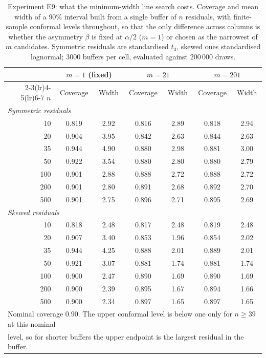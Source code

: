 \begin{table}[ht]
\centering
\small
\setlength{\tabcolsep}{5pt}
\caption{Experiment E9: what the minimum-width line search costs.
         Coverage and mean width of a $90\%$ interval built from a
         single buffer of $n$ residuals, with finite-sample conformal
         levels throughout, so that the only difference across
         columns is whether the asymmetry $\beta$ is fixed at
         $\alpha/2$ ($m = 1$) or chosen as the narrowest of $m$
         candidates.  Symmetric residuals are standardised $t_3$,
         skewed ones standardised lognormal; $3000$ buffers per cell,
         evaluated against $200\,000$ draws.}
\label{tab:e9_linesearch}
\begin{tabular}{r cc cc cc}
\toprule
 & \multicolumn{2}{c}{$m = 1$ (fixed)} & \multicolumn{2}{c}{$m = 21$} & \multicolumn{2}{c}{$m = 201$} \\
\cmidrule(lr){2-3}\cmidrule(lr){4-5}\cmidrule(lr){6-7}
$n$ & Coverage & Width & Coverage & Width & Coverage & Width \\
\midrule
\multicolumn{7}{l}{\emph{Symmetric residuals}} \\
10 & 0.819 & 2.92 & 0.816 & 2.89 & 0.818 & 2.94 \\
20 & 0.904 & 3.95 & 0.842 & 2.63 & 0.844 & 2.63 \\
35 & 0.944 & 4.90 & 0.880 & 2.98 & 0.881 & 3.00 \\
50 & 0.922 & 3.54 & 0.880 & 2.80 & 0.880 & 2.79 \\
100 & 0.901 & 2.88 & 0.888 & 2.72 & 0.888 & 2.72 \\
200 & 0.901 & 2.80 & 0.891 & 2.68 & 0.892 & 2.70 \\
500 & 0.901 & 2.75 & 0.896 & 2.71 & 0.895 & 2.69 \\
\midrule
\multicolumn{7}{l}{\emph{Skewed residuals}} \\
10 & 0.818 & 2.48 & 0.817 & 2.48 & 0.819 & 2.48 \\
20 & 0.907 & 3.40 & 0.853 & 1.96 & 0.854 & 2.02 \\
35 & 0.944 & 4.25 & 0.888 & 2.01 & 0.889 & 2.01 \\
50 & 0.921 & 3.07 & 0.881 & 1.74 & 0.881 & 1.74 \\
100 & 0.900 & 2.47 & 0.890 & 1.69 & 0.890 & 1.69 \\
200 & 0.900 & 2.39 & 0.895 & 1.67 & 0.894 & 1.66 \\
500 & 0.900 & 2.34 & 0.897 & 1.65 & 0.897 & 1.65 \\
\bottomrule
\multicolumn{7}{l}{\footnotesize Nominal coverage $0.90$.  The upper
 conformal level is below one only for $n \geq 39$ at this nominal}\\
\multicolumn{7}{l}{\footnotesize level, so for shorter buffers the
 upper endpoint is the largest residual in the buffer.}\\
\end{tabular}
\end{table}
